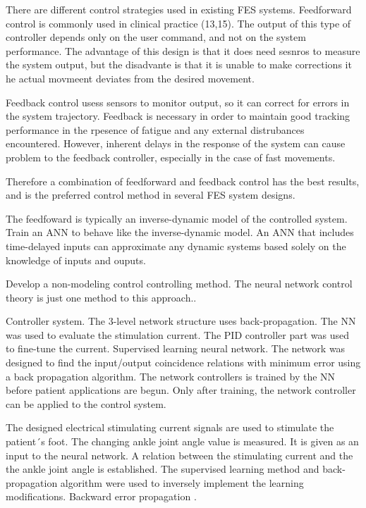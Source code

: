 There are different control strategies used in existing FES systems. Feedforward control is commonly used in clinical practice (13,15). The output of this type of controller depends only on the user command, and not on the system performance. The advantage of this design is that it does need sesnros to measure the system output, but the disadvante is that it is unable to make corrections it he actual movmeent deviates from the desired movement. \cite{CFF}

Feedback control usess sensors to monitor output, so it can correct for errors in the system trajectory. Feedback is necessary in order to maintain good tracking performance in the rpesence of fatigue and any external distrubances encountered. However, inherent delays in the response of the system can cause problem to the feedback controller, especially in the case of fast movements. \cite{CFF}

Therefore a combination of feedforward and feedback control has the best results, and is the preferred control method in several FES system designs. 

The feedfoward is typically an inverse-dynamic model of the controlled system. Train an ANN to behave like the inverse-dynamic model. An ANN that includes time-delayed inputs can approximate any dynamic systems based solely on the knowledge of inputs and ouputs.

Develop a non-modeling control controlling method. The neural network control theory is just one method to this approach.\cite{NNPID}.

Controller system. The 3-level network structure uses back-propagation. The NN was used to evaluate the stimulation current. The PID controller part was used to fine-tune the current. Supervised learning neural network. The network was designed to find the input/output coincidence relations with minimum error using a back propagation algorithm. The network controllers is trained by the NN before patient applications are begun. Only after training, the network controller can be applied to the control system. \cite{NNPID}

The designed electrical stimulating current signals are used to stimulate the patient´s foot. The changing ankle joint angle value is measured. It is given as an input to the neural network. A relation between the stimulating current and the the ankle joint angle is established. The supervised learning method and back-propagation algorithm were used to inversely implement the learning modifications. Backward error propagation \cite{NNPID}.

